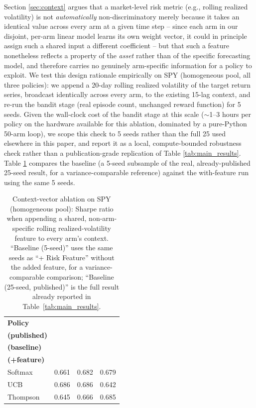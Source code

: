 \documentclass[pdflatex,sn-mathphys-num]{sn-jnl}
\theoremstyle{thmstyleone}%
\theoremstyle{thmstyletwo}%
\theoremstyle{thmstylethree}%
\begin{document}
\begin{appendices}
Section \ref{sec:context} argues that a market-level risk metric (e.g., rolling realized volatility) is not \emph{automatically} non-discriminatory merely because it takes an identical value across every arm at a given time step -- since each arm in our disjoint, per-arm linear model learns its own weight vector, it could in principle assign such a shared input a different coefficient -- but that such a feature nonetheless reflects a property of the \emph{asset} rather than of the specific forecasting model, and therefore carries no genuinely arm-specific information for a policy to exploit. We test this design rationale empirically on SPY (homogeneous pool, all three policies): we append a 20-day rolling realized volatility of the target return series, broadcast identically across every arm, to the existing 15-lag context, and re-run the bandit stage (real episode count, unchanged reward function) for 5 seeds. Given the wall-clock cost of the bandit stage at this scale ($\sim$1--3 hours per policy on the hardware available for this ablation, dominated by a pure-Python 50-arm loop), we scope this check to 5 seeds rather than the full 25 used elsewhere in this paper, and report it as a local, compute-bounded robustness check rather than a publication-grade replication of Table \ref{tab:main_results}. Table \ref{tab:ablation} compares the baseline (a 5-seed subsample of the real, already-published 25-seed result, for a variance-comparable reference) against the with-feature run using the same 5 seeds.

\begin{table}[htbp]
    \centering
    \caption{Context-vector ablation on SPY (homogeneous pool): Sharpe ratio when appending a shared, non-arm-specific rolling realized-volatility feature to every arm's context. ``Baseline (5-seed)'' uses the same seeds as ``+ Risk Feature'' without the added feature, for a variance-comparable comparison; ``Baseline (25-seed, published)'' is the full result already reported in Table~\ref{tab:main_results}.}
    \label{tab:ablation}
    \setlength{\tabcolsep}{3pt}
    \scriptsize
    \begin{tabular}{@{} l rrr @{}}
    \toprule
    \textbf{Policy} & \shortstack{\textbf{25-seed}\\\textbf{(published)}} & \shortstack{\textbf{5-seed}\\\textbf{(baseline)}} & \shortstack{\textbf{5-seed}\\\textbf{(+feature)}} \\
    \midrule
    Softmax & 0.661 & 0.682 & 0.679 \\
    UCB & 0.686 & 0.686 & 0.642 \\
    Thompson & 0.645 & 0.666 & 0.685 \\
    \bottomrule
    \end{tabular}
\end{table}


\end{appendices}
\end{document}
